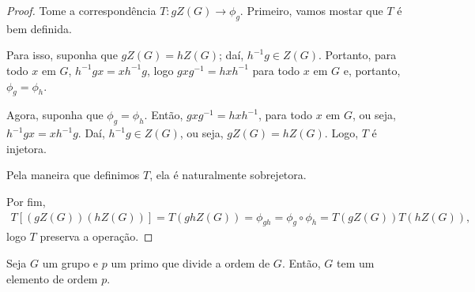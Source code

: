 	\begin{proof}
		Tome a correspondência $T:gZ(G)\to \phi_g$. Primeiro, vamos mostar que $T$ é bem definida. 
		\par\vspace{0.3cm} Para isso, suponha que $gZ(G) = hZ(G)$; daí, $h^{-1}g\in Z(G)$. 
		Portanto, para todo $x$ em $G$, $h^{-1}gx = xh^{-1}g$, logo $gxg^{-1} = hxh^{-1}$ para todo 
		$x$ em $G$ e, portanto, $\phi_g = \phi_h$. 
		\par\vspace{0.3cm} Agora, suponha que $\phi_g = \phi_h$. Então, $gxg^{-1} = hxh^{-1}$, 
		para todo $x$ em $G$, ou seja, $h^{-1}gx = xh^{-1}g$. Daí, $h^{-1}g\in Z(G)$, ou seja, 
		$gZ(G) = hZ(G)$. Logo, $T$ é injetora.
		\par\vspace{0.3cm} Pela maneira que definimos $T$, ela é naturalmente sobrejetora. 
		\par\vspace{0.3cm} Por fim,
		\begin{align*}
		    T[(gZ(G))(hZ(G))] = T(ghZ(G)) = \phi_{gh} = \phi_g\circ\phi_h = T(gZ(G))T(hZ(G)),
		\end{align*}
		logo $T$ preserva a operação.
	\end{proof}
	\begin{theorem}
	\label{cauchy}
		Seja $G$ um grupo e $p$ um primo que divide a ordem de $G$. Então, $G$ tem um elemento de ordem $p$.
	\end{theorem}
	
